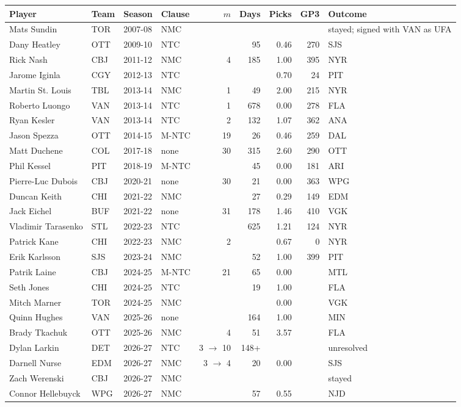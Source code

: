 \begin{tabular}{llllrrrrl}\toprule
Player & Team & Season & Clause & $m$ & Days & Picks & GP3 & Outcome\\\midrule
Mats Sundin & TOR & 2007-08 & NMC &  &  &  &  & stayed; signed with VAN as UFA\\
Dany Heatley & OTT & 2009-10 & NTC &  & 95 & 0.46 & 270 & SJS\\
Rick Nash & CBJ & 2011-12 & NMC & 4 & 185 & 1.00 & 395 & NYR\\
Jarome Iginla & CGY & 2012-13 & NTC &  &  & 0.70 & 24 & PIT\\
Martin St. Louis & TBL & 2013-14 & NMC & 1 & 49 & 2.00 & 215 & NYR\\
Roberto Luongo & VAN & 2013-14 & NTC & 1 & 678 & 0.00 & 278 & FLA\\
Ryan Kesler & VAN & 2013-14 & NTC & 2 & 132 & 1.07 & 362 & ANA\\
Jason Spezza & OTT & 2014-15 & M-NTC & 19 & 26 & 0.46 & 259 & DAL\\
Matt Duchene & COL & 2017-18 & none & 30 & 315 & 2.60 & 290 & OTT\\
Phil Kessel & PIT & 2018-19 & M-NTC &  & 45 & 0.00 & 181 & ARI\\
Pierre-Luc Dubois & CBJ & 2020-21 & none & 30 & 21 & 0.00 & 363 & WPG\\
Duncan Keith & CHI & 2021-22 & NMC &  & 27 & 0.29 & 149 & EDM\\
Jack Eichel & BUF & 2021-22 & none & 31 & 178 & 1.46 & 410 & VGK\\
Vladimir Tarasenko & STL & 2022-23 & NTC &  & 625 & 1.21 & 124 & NYR\\
Patrick Kane & CHI & 2022-23 & NMC & 2 &  & 0.67 & 0 & NYR\\
Erik Karlsson & SJS & 2023-24 & NMC &  & 52 & 1.00 & 399 & PIT\\
Patrik Laine & CBJ & 2024-25 & M-NTC & 21 & 65 & 0.00 &  & MTL\\
Seth Jones & CHI & 2024-25 & NTC &  & 19 & 1.00 &  & FLA\\
Mitch Marner & TOR & 2024-25 & NMC &  &  & 0.00 &  & VGK\\
Quinn Hughes & VAN & 2025-26 & none &  & 164 & 1.00 &  & MIN\\
Brady Tkachuk & OTT & 2025-26 & NMC & 4 & 51 & 3.57 &  & FLA\\
Dylan Larkin & DET & 2026-27 & NTC & 3 $\to$ 10 & 148+ &  &  & unresolved\\
Darnell Nurse & EDM & 2026-27 & NMC & 3 $\to$ 4 & 20 & 0.00 &  & SJS\\
Zach Werenski & CBJ & 2026-27 & NMC &  &  &  &  & stayed\\
Connor Hellebuyck & WPG & 2026-27 & NMC &  & 57 & 0.55 &  & NJD\\
\bottomrule\end{tabular}